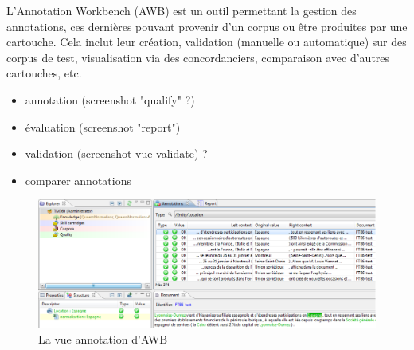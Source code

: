 \documentclass[citation\_needed]{subfiles}
\begin{document}
L'Annotation Workbench (AWB) est un outil permettant la gestion des annotations, ces dernières pouvant provenir d'un corpus ou être produites par une cartouche. Cela inclut leur création, validation (manuelle ou automatique) sur des corpus de test, visualisation via des concordanciers, comparaison avec d'autres cartouches, etc.
\begin{itemize}
    \item annotation (screenshot "qualify" ?)
    \item évaluation (screenshot "report")
    \item validation (screenshot vue validate) ?
    \item comparer annotations
\end{itemize}

\begin{figure}[ht!]
\includegraphics[scale=0.6]{images/Luxid/AWB-1}
\caption{La vue annotation d'AWB}
\label{fig:AWB-overview}
\end{figure}
\end{document}
